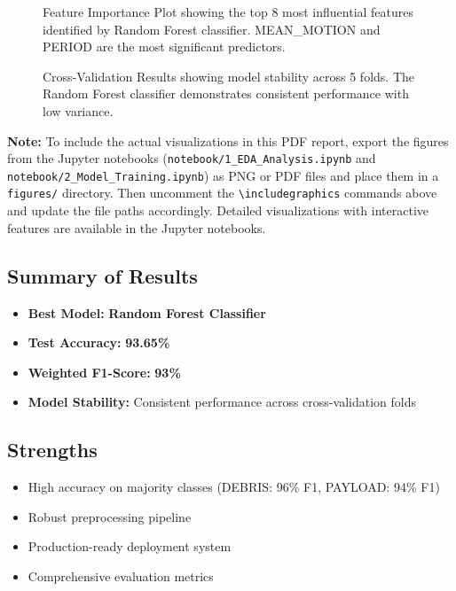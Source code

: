 \documentclass[12pt,a4paper]{article}
\newcommand{\highlight}[1]{\textcolor{primaryblue}{\textbf{#1}}}
\newcommand{\metric}[1]{\textcolor{secondaryblue}{\textbf{#1}}}
\begin{document}
\begin{figure}[H]
\centering
\caption{Feature Importance Plot showing the top 8 most influential features identified by Random Forest classifier. MEAN\_MOTION and PERIOD are the most significant predictors.}
\label{fig:feature_importance}
\end{figure}

\begin{figure}[H]
\centering
\caption{Cross-Validation Results showing model stability across 5 folds. The Random Forest classifier demonstrates consistent performance with low variance.}
\label{fig:cross_validation}
\end{figure}

\textbf{Note:} To include the actual visualizations in this PDF report, export the figures from the Jupyter notebooks (\texttt{notebook/1\_EDA\_Analysis.ipynb} and \texttt{notebook/2\_Model\_Training.ipynb}) as PNG or PDF files and place them in a \texttt{figures/} directory. Then uncomment the \texttt{\textbackslash includegraphics} commands above and update the file paths accordingly. Detailed visualizations with interactive features are available in the Jupyter notebooks.

\subsection{Summary of Results}
\begin{itemize}
    \item \textbf{Best Model:} \highlight{Random Forest Classifier}
    \item \textbf{Test Accuracy:} \highlight{93.65\%}
    \item \textbf{Weighted F1-Score:} \metric{93\%}
    \item \textbf{Model Stability:} Consistent performance across cross-validation folds
\end{itemize}

\subsection{Strengths}
\begin{itemize}
    \item High accuracy on majority classes (DEBRIS: 96\% F1, PAYLOAD: 94\% F1)
    \item Robust preprocessing pipeline
    \item Production-ready deployment system
    \item Comprehensive evaluation metrics
\end{itemize}
\end{document}
